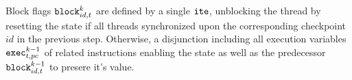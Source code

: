 

\noindent
Block flags $\texttt{block}^k_{id, t}$ are defined by a single $\texttt{ite}$, unblocking the thread by resetting the state if all threads synchronized upon the corresponding checkpoint $id$ in the previous step. %
Otherwise,  a disjunction including all execution variables $\texttt{exec}^{k - 1}_{t, pc}$ of related  instructions enabling the state as well as the predecessor $\texttt{block}^{k - 1}_{id, t}$ to presere it's value.

